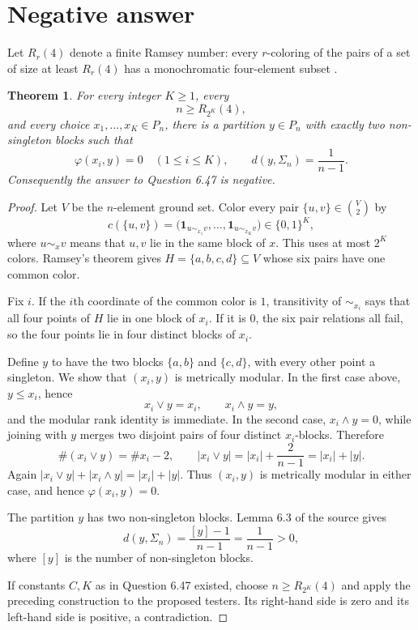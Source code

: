 \documentclass[11pt]{article}
\newtheorem{theorem}{Theorem}
\newcommand{\ph}{\varphi}
\begin{document}
\section{Negative answer}

Let $R_r(4)$ denote a finite Ramsey number: every $r$-coloring of the pairs of
a set of size at least $R_r(4)$ has a monochromatic four-element subset
\cite{GRS}.

\begin{theorem}\label{thm:main}
For every integer $K\ge1$, every
\[
 n\ge R_{2^K}(4),
\]
and every choice $x_1,\ldots,x_K\in P_n$, there is a partition $y\in P_n$
with exactly two non-singleton blocks such that
\[
 \ph(x_i,y)=0\quad(1\le i\le K),
 \qquad d(y,\Sigma_n)=\frac1{n-1}.
\]
Consequently the answer to Question 6.47 is negative.
\end{theorem}

\begin{proof}
Let $V$ be the $n$-element ground set.  Color every pair $\{u,v\}\in
\binom V2$ by
\[
 c(\{u,v\})=
 \bigl(\mathbf 1_{u\sim_{x_1}v},\ldots,
       \mathbf 1_{u\sim_{x_K}v}\bigr)\in\{0,1\}^K,
\]
where $u\sim_xv$ means that $u,v$ lie in the same block of $x$.  This uses at
most $2^K$ colors.  Ramsey's theorem gives
$H=\{a,b,c,d\}\subseteq V$ whose six pairs have one common color.

Fix $i$.  If the $i$th coordinate of the common color is $1$, transitivity of
$\sim_{x_i}$ says that all four points of $H$ lie in one block of $x_i$.  If it
is $0$, the six pair relations all fail, so the four points lie in four
distinct blocks of $x_i$.

Define $y$ to have the two blocks $\{a,b\}$ and $\{c,d\}$, with every other
point a singleton.  We show that $(x_i,y)$ is metrically modular.  In the first
case above, $y\le x_i$, hence
\[
 x_i\vee y=x_i,\qquad x_i\wedge y=y,
\]
and the modular rank identity is immediate.  In the second case,
$x_i\wedge y=0$, while joining with $y$ merges two disjoint pairs of four
distinct $x_i$-blocks.  Therefore
\[
 \#(x_i\vee y)=\#x_i-2,
 \qquad |x_i\vee y|=|x_i|+\frac2{n-1}=|x_i|+|y|.
\]
Again
$|x_i\vee y|+|x_i\wedge y|=|x_i|+|y|$.  Thus $(x_i,y)$ is metrically
modular in either case, and hence $\ph(x_i,y)=0$.

The partition $y$ has two non-singleton blocks.  Lemma 6.3 of the source gives
\[
 d(y,\Sigma_n)=\frac{[y]-1}{n-1}=\frac1{n-1}>0,
\]
where $[y]$ is the number of non-singleton blocks.

If constants $C,K$ as in Question 6.47 existed, choose
$n\ge R_{2^K}(4)$ and apply the preceding construction to the proposed
testers.  Its right-hand side is zero and its left-hand side is positive, a
contradiction.
\end{proof}
\end{document}
